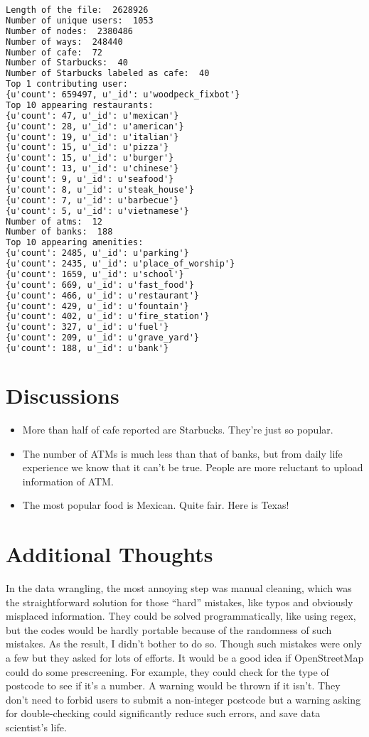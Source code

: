 \documentclass[12pt]{article}
\begin{document}
\begin{lstlisting}[language=xml,breaklines=tr, basicstyle=\small,keywordstyle=\color{blue!70},commentstyle=\color{red!50!green!50!blue!50},frame=shadowbox, rulesepcolor=\color{red!20!green!20!blue!20}]
Length of the file:  2628926
Number of unique users:  1053
Number of nodes:  2380486
Number of ways:  248440
Number of cafe:  72
Number of Starbucks:  40
Number of Starbucks labeled as cafe:  40
Top 1 contributing user:
{u'count': 659497, u'_id': u'woodpeck_fixbot'}
Top 10 appearing restaurants:
{u'count': 47, u'_id': u'mexican'}
{u'count': 28, u'_id': u'american'}
{u'count': 19, u'_id': u'italian'}
{u'count': 15, u'_id': u'pizza'}
{u'count': 15, u'_id': u'burger'}
{u'count': 13, u'_id': u'chinese'}
{u'count': 9, u'_id': u'seafood'}
{u'count': 8, u'_id': u'steak_house'}
{u'count': 7, u'_id': u'barbecue'}
{u'count': 5, u'_id': u'vietnamese'}
Number of atms:  12
Number of banks:  188
Top 10 appearing amenities:
{u'count': 2485, u'_id': u'parking'}
{u'count': 2435, u'_id': u'place_of_worship'}
{u'count': 1659, u'_id': u'school'}
{u'count': 669, u'_id': u'fast_food'}
{u'count': 466, u'_id': u'restaurant'}
{u'count': 429, u'_id': u'fountain'}
{u'count': 402, u'_id': u'fire_station'}
{u'count': 327, u'_id': u'fuel'}
{u'count': 209, u'_id': u'grave_yard'}
{u'count': 188, u'_id': u'bank'}
\end{lstlisting}

\section{Discussions}
\begin{itemize}
\item More than half of cafe reported are Starbucks. They're just so popular.
\item The number of ATMs is much less than that of banks, but from daily life experience we know that it can't be true. People are more reluctant to upload information of ATM.
\item  The most popular food is Mexican. Quite fair. Here is Texas!
\end{itemize}

\section{Additional Thoughts}
In the data wrangling, the most annoying step was manual cleaning, which was the straightforward solution for those ``hard'' mistakes, like typos and obviously misplaced information. They could be solved programmatically, like using regex, but the codes would be hardly portable because of the randomness of such mistakes. As the result, I didn't bother to do so. Though such mistakes were only a few but they asked for lots of efforts. It would be a good idea if OpenStreetMap could do some prescreening. For example, they could check for the type of postcode to see if it's a number. A warning would be thrown if it isn't. They don't need to forbid users to submit a non-integer postcode but a warning asking for double-checking could significantly reduce such errors, and save data scientist's life.
\end{document}
